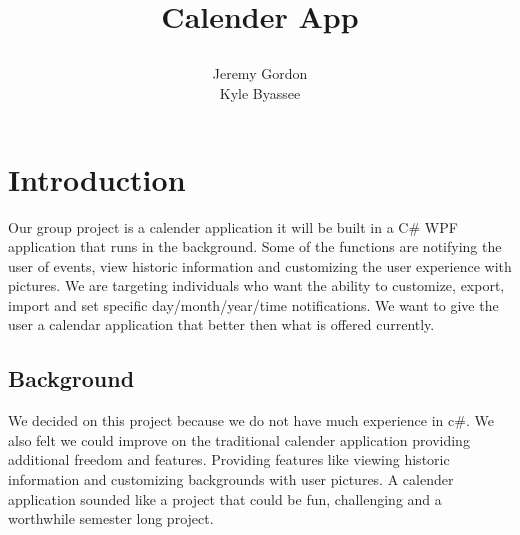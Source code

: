 \documentclass[10pt,conference,onecolumn,compsoc]{IEEEtran}
\begin{document}
\title{Calender App
%
%


\author{Jeremy Gordon\\ Kyle Byassee%
}
}


\maketitle



\IEEEdisplaynontitleabstractindextext

\IEEEpeerreviewmaketitle



\section{Introduction}

Our group project is a calender application it will be built in a C\# WPF application that runs in the background. Some of the functions are notifying the user of events, view historic information and customizing the user experience with pictures. We are targeting individuals who want the ability to customize, export, import and set specific day/month/year/time notifications. 
We want to give the user a calendar application that better then what is offered currently.

\subsection{Background}
We decided on this project because we do not have much experience in c\#. We also felt we could improve on the traditional calender application providing additional freedom and features. Providing features like viewing historic information and customizing backgrounds with user pictures. A calender application sounded like a project that could be fun, challenging and a worthwhile semester long project.
\end{document}
